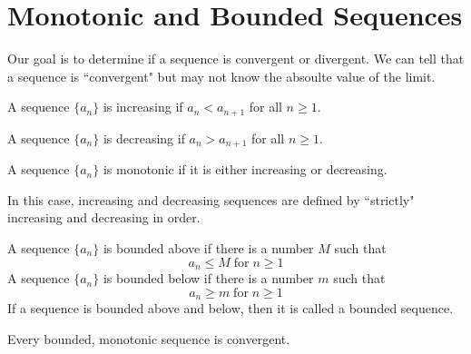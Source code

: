 \section{Monotonic and Bounded Sequences}

Our goal is to determine if a sequence is convergent or divergent. We can tell that a sequence is ``convergent" but may not know the absoulte value of the limit.

\begin{definition}
  A sequence \(\{a_{n}\}\) is increasing if \(a_{n} < a_{n + 1}\) for all \(n \ge 1\).
\end{definition}

\begin{definition}
  A sequence \(\{a_{n}\}\) is decreasing if \(a_{n} > a_{n + 1}\) for all \(n \ge 1\).
\end{definition}

\begin{definition}
  A sequence \(\{a_{n}\}\) is monotonic if it is either increasing or decreasing.
\end{definition}

\begin{remark}
  In this case, increasing and decreasing sequences are defined by ``strictly" increasing and decreasing in order.
\end{remark}

\begin{definition}
  A sequence \(\{a_{n}\}\) is bounded above if there is a number \(M\) such that
  \[
    a_{n} \le M \; \mathrm{for} \; n \ge 1
  \]
  A sequence \(\{a_{n}\}\) is bounded below if there is a number \(m\) such that
  \[
    a_{n} \ge m \; \mathrm{for} \; n \ge 1
  \]
  If a sequence is bounded above and below, then it is called a bounded sequence.
\end{definition}

\begin{theorem}
  Every bounded, monotonic sequence is convergent.
\end{theorem}

